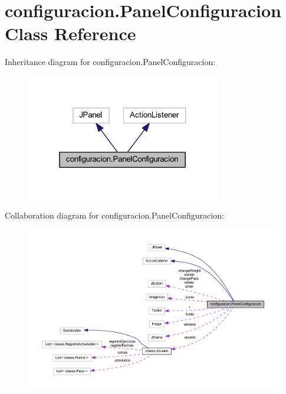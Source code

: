 \hypertarget{classconfiguracion_1_1_panel_configuracion}{}\section{configuracion.\+Panel\+Configuracion Class Reference}
\label{classconfiguracion_1_1_panel_configuracion}


Inheritance diagram for configuracion.\+Panel\+Configuracion\+:
\nopagebreak
\begin{figure}[H]
\begin{center}
\leavevmode
\includegraphics[width=241pt]{classconfiguracion_1_1_panel_configuracion__inherit__graph}
\end{center}
\end{figure}


Collaboration diagram for configuracion.\+Panel\+Configuracion\+:
\nopagebreak
\begin{figure}[H]
\begin{center}
\leavevmode
\includegraphics[width=350pt]{classconfiguracion_1_1_panel_configuracion__coll__graph}
\end{center}
\end{figure}
